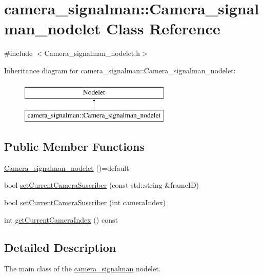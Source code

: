 \hypertarget{classcamera__signalman_1_1Camera__signalman__nodelet}{}\section{camera\+\_\+signalman\+::Camera\+\_\+signalman\+\_\+nodelet Class Reference}
\label{classcamera__signalman_1_1Camera__signalman__nodelet}


{\ttfamily \#include $<$Camera\+\_\+signalman\+\_\+nodelet.\+h$>$}

Inheritance diagram for camera\+\_\+signalman\+::Camera\+\_\+signalman\+\_\+nodelet\+:\begin{figure}[H]
\begin{center}
\leavevmode
\includegraphics[height=2.000000cm]{classcamera__signalman_1_1Camera__signalman__nodelet}
\end{center}
\end{figure}
\subsection*{Public Member Functions}
\begin{DoxyCompactItemize}
\item 
\mbox{\hyperlink{classcamera__signalman_1_1Camera__signalman__nodelet_aeda05ff39bb863e934381f914f55cc6e}{Camera\+\_\+signalman\+\_\+nodelet}} ()=default
\item 
bool \mbox{\hyperlink{classcamera__signalman_1_1Camera__signalman__nodelet_abbc3105ad2d75df884e7f62a40cecb87}{set\+Current\+Camera\+Suscriber}} (const std\+::string \&frame\+ID)
\item 
bool \mbox{\hyperlink{classcamera__signalman_1_1Camera__signalman__nodelet_a04659efde343f9690deca8425f3c9c37}{set\+Current\+Camera\+Suscriber}} (int camera\+Index)
\item 
int \mbox{\hyperlink{classcamera__signalman_1_1Camera__signalman__nodelet_a321e800523b67be8f2250d068012e578}{get\+Current\+Camera\+Index}} () const
\end{DoxyCompactItemize}


\subsection{Detailed Description}
The main class of the \mbox{\hyperlink{namespacecamera__signalman}{camera\+\_\+signalman}} nodelet. 

